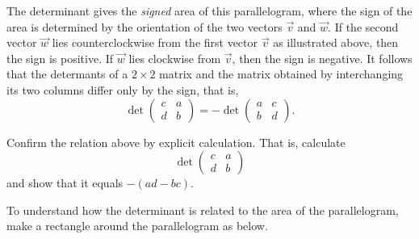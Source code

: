 \documentclass{ximera}
\begin{document}
The determinant gives the \textit{signed} area of this parallelogram,
where the sign of the area is determined by the orientation of the two
vectors $\vec{v}$ and $\vec{w}$. If the second vector $\vec{w}$ lies
counterclockwise from the first vector $\vec{v}$ as illustrated above,
then the sign is positive. If $\vec{w}$ lies clockwise from $\vec{v}$,
then the sign is negative. It follows that the determants of a
$2 \times 2$ matrix and the matrix obtained by interchanging its two
columns differ only by the sign, that is,
\[
  \det
  \begin{pmatrix}
    c & a \\ d & b
  \end{pmatrix}
  =
  - \det
  \begin{pmatrix}
    a & c \\ b & d
  \end{pmatrix}.
\]

\begin{question}
  Confirm the relation above by explicit calculation. That is,
  calculate
  \[
    \det
    \begin{pmatrix}
      c & a \\ d & b
    \end{pmatrix}
  \]
  and show that it equals $-(ad - bc)$.
\end{question}

To understand how the determinant is related to the area of the
parallelogram, make a rectangle around the parallelogram as below.
\end{document}
